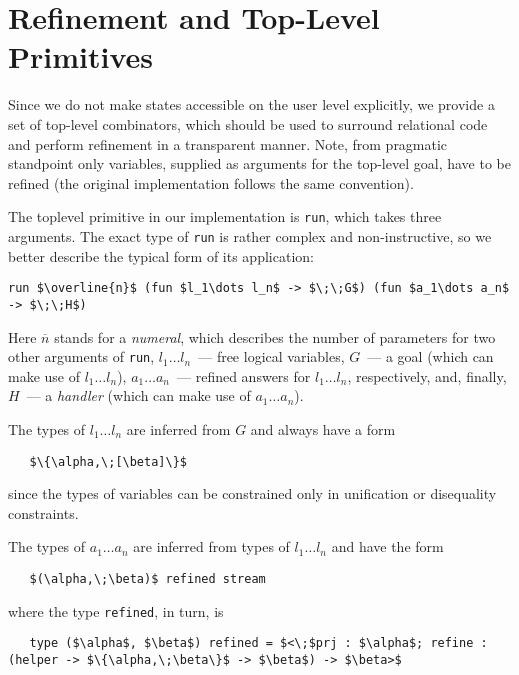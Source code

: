\section{Refinement and Top-Level Primitives}
\label{refinement}

Since we do not make states accessible on the user level explicitly, we provide
a set of top-level combinators, which should be used to surround relational code
and perform refinement in a transparent manner. Note, from pragmatic
standpoint only variables, supplied as arguments for the top-level goal, have
to be refined (the original \miniKanren implementation follows the same convention).

The toplevel primitive in our implementation is \lstinline{run}, which takes three
arguments. The exact type of \lstinline{run} is rather complex and non-instructive, 
so we better describe the typical form of its application:

\begin{lstlisting}[mathescape=true]
   run $\overline{n}$ (fun $l_1\dots l_n$ -> $\;\;G$) (fun $a_1\dots a_n$ -> $\;\;H$)
\end{lstlisting}

Here $\overline{n}$ stands for a \emph{numeral}, which describes the number of
parameters for two other arguments of \lstinline{run}, \mbox{$l_1\dots l_n$}~---
free logical variables, $G$~--- a goal (which can make use of \mbox{$l_1\dots l_n$}), 
\mbox{$a_1\dots a_n$}~--- refined answers for \mbox{$l_1\dots l_n$}, respectively, and, 
finally, $H$~--- a \emph{handler} (which can make use of \mbox{$a_1\dots a_n$}). 

The types of \mbox{$l_1\dots l_n$} are inferred from $G$ and always have a form

\begin{lstlisting}
   $\{\alpha,\;[\beta]\}$
\end{lstlisting}

since the types of variables can be constrained only in unification or disequality constraints.

The types of \mbox{$a_1\dots a_n$} are inferred from types of \mbox{$l_1\dots l_n$} and
have the form

\begin{lstlisting}
   $(\alpha,\;\beta)$ refined stream
\end{lstlisting}

where the type \lstinline{refined}, in turn, is

\begin{lstlisting}
   type ($\alpha$, $\beta$) refined = $<\;$prj : $\alpha$; refine : (helper -> $\{\alpha,\;\beta\}$ -> $\beta$) -> $\beta>$
\end{lstlisting}

